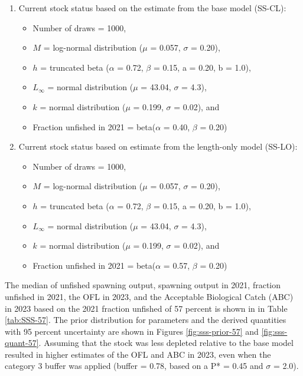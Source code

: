 \documentclass[11pt,
  english,
  a4paper,
]{article}
\begin{document}
\leavevmode\tagmcend\tagstructend\par

\begin{enumerate}

    \item Current stock status based on the estimate from the base model (SS-CL):
    \begin{itemize}
        \item Number of draws = 1000,
        \item $M$ = log-normal distribution ($\mu$ = 0.057, $\sigma$ = 0.20),
        \item $h$ = truncated beta ($\alpha$ = 0.72, $\beta$ = 0.15, a = 0.20, b = 1.0),
        \item $L_{\infty}$ = normal distribution ($\mu$ = 43.04, $\sigma$ = 4.3),
        \item $k$ = normal distribution ($\mu$ = 0.199, $\sigma$ = 0.02), and
        \item Fraction unfished in 2021 = beta($\alpha$ = 0.40, $\beta$ = 0.20)
    \end{itemize}
    \item Current stock status based on estimate from the length-only model (SS-LO):
    \begin{itemize}
        \item Number of draws = 1000,
        \item $M$ = log-normal distribution ($\mu$ = 0.057, $\sigma$ = 0.20),
        \item $h$ = truncated beta ($\alpha$ = 0.72, $\beta$ = 0.15, a = 0.20, b = 1.0),
        \item $L_{\infty}$ = normal distribution ($\mu$ = 43.04, $\sigma$ = 4.3),
        \item $k$ = normal distribution ($\mu$ = 0.199, $\sigma$ = 0.02), and
        \item Fraction unfished in 2021 = beta($\alpha$ = 0.57, $\beta$ = 0.20)
    \end{itemize}
    
\end{enumerate}


The median of unfished spawning output, spawning output in 2021, fraction unfished in 2021, the OFL in 2023, and the Acceptable Biological Catch (ABC) in 2023 based on the 2021 fraction unfished of 57 percent is shown in in Table \ref{tab:SSS-57}. The prior distribution for parameters and the derived quantities with 95 percent uncertainty are shown in Figures \ref{fig:sss-prior-57} and \ref{fig:sss-quant-57}. Assuming that the stock was less depleted relative to the base model resulted in higher estimates of the OFL and ABC in 2023, even when the category 3 buffer was applied (buffer = 0.78, based on a P* = 0.45 and {\(\sigma\)\leavevmode\tagmcend\tagstructend} = 2.0).
\end{document}

